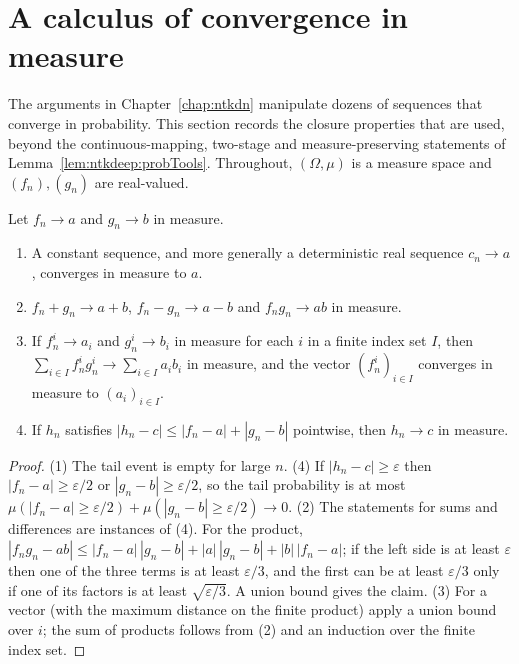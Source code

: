 \section{A calculus of convergence in measure}\label{sec:ntkcond:mconv}

The arguments in Chapter~\ref{chap:ntkdn} manipulate dozens of sequences that converge in probability. This section records the closure properties that are used, beyond the continuous-mapping, two-stage and measure-preserving statements of Lemma~\ref{lem:ntkdeep:probTools}. Throughout, $(\Omega,\mu)$ is a measure space and $(f_n),(g_n)$ are real-valued.

\begin{lemma}\label{lem:ntkcond:mconvAlgebra}
  \leanok
Let $f_n\to a$ and $g_n\to b$ in measure.
\begin{enumerate}
  \item A constant sequence, and more generally a deterministic real sequence $c_n\to a$, converges in measure to $a$.
  \item $f_n+g_n\to a+b$, $f_n-g_n\to a-b$ and $f_ng_n\to ab$ in measure.
  \item If $f^i_n\to a_i$ and $g^i_n\to b_i$ in measure for each $i$ in a finite index set $I$, then $\sum_{i\in I}f^i_ng^i_n\to\sum_{i\in I}a_ib_i$ in measure, and the vector $(f^i_n)_{i\in I}$ converges in measure to $(a_i)_{i\in I}$.
  \item If $h_n$ satisfies $|h_n-c|\le|f_n-a|+|g_n-b|$ pointwise, then $h_n\to c$ in measure.
\end{enumerate}
\end{lemma}

\begin{proof}
  \leanok
(1) The tail event is empty for large $n$. (4) If $|h_n-c|\ge\varepsilon$ then $|f_n-a|\ge\varepsilon/2$ or $|g_n-b|\ge\varepsilon/2$, so the tail probability is at most $\mu(|f_n-a|\ge\varepsilon/2)+\mu(|g_n-b|\ge\varepsilon/2)\to0$. (2) The statements for sums and differences are instances of (4). For the product, $|f_ng_n-ab|\le|f_n-a|\,|g_n-b|+|a|\,|g_n-b|+|b|\,|f_n-a|$; if the left side is at least $\varepsilon$ then one of the three terms is at least $\varepsilon/3$, and the first can be at least $\varepsilon/3$ only if one of its factors is at least $\sqrt{\varepsilon/3}$. A union bound gives the claim. (3) For a vector (with the maximum distance on the finite product) apply a union bound over $i$; the sum of products follows from (2) and an induction over the finite index set.
\end{proof}

